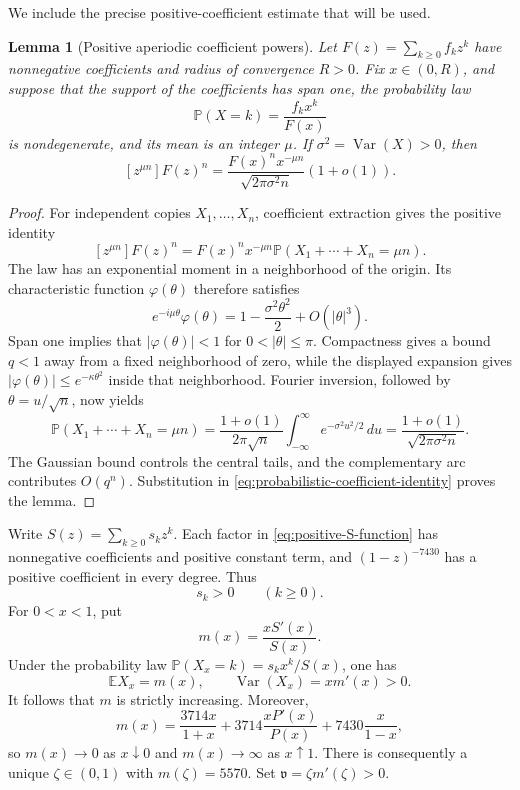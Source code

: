 \documentclass[11pt,reqno,letterpaper]{amsart}
\numberwithin{equation}{section}
\newtheorem{lemma}[theorem]{Lemma}
\theoremstyle{definition}
\theoremstyle{remark}
\begin{document}
We include the precise positive-coefficient estimate that will be used.

\begin{lemma}[Positive aperiodic coefficient powers]
\label{lem:positive-coefficient-powers}
Let \(F(z)=\sum_{k\geq0}f_kz^k\) have nonnegative coefficients and
radius of convergence \(R>0\).  Fix \(x\in(0,R)\), and suppose that the
support of the coefficients has span one, the probability law
\[
 \mathbb P(X=k)=\frac{f_kx^k}{F(x)}
\]
is nondegenerate, and its mean is an integer \(\mu\).  If
\(\sigma^2=\operatorname{Var}(X)>0\), then
\begin{equation}\label{eq:positive-power-asymptotic}
 [z^{\mu n}]F(z)^n
 =\frac{F(x)^nx^{-\mu n}}{\sqrt{2\pi\sigma^2n}}
  (1+o(1)).
\end{equation}
\end{lemma}

\begin{proof}
For independent copies \(X_1,\ldots,X_n\), coefficient extraction gives
the positive identity
\begin{equation}\label{eq:probabilistic-coefficient-identity}
 [z^{\mu n}]F(z)^n
 =F(x)^nx^{-\mu n}
  \mathbb P(X_1+\cdots+X_n=\mu n).
\end{equation}
The law has an exponential moment in a neighborhood of the origin.  Its
characteristic function \(\varphi(\theta)\) therefore satisfies
\[
 e^{-i\mu\theta}\varphi(\theta)
 =1-\frac{\sigma^2\theta^2}{2}+O(|\theta|^3).
\]
Span one implies that \(|\varphi(\theta)|<1\) for
\(0<|\theta|\leq\pi\).  Compactness gives a bound \(q<1\) away from a
fixed neighborhood of zero, while the displayed expansion gives
\(|\varphi(\theta)|\leq e^{-\kappa\theta^2}\) inside that neighborhood.
Fourier inversion, followed by \(\theta=u/\sqrt n\), now yields
\[
 \mathbb P(X_1+\cdots+X_n=\mu n)
 =\frac{1+o(1)}{2\pi\sqrt n}
   \int_{-\infty}^{\infty}e^{-\sigma^2u^2/2}\,du
 =\frac{1+o(1)}{\sqrt{2\pi\sigma^2n}}.
\]
The Gaussian bound controls the central tails, and the complementary
arc contributes \(O(q^n)\).  Substitution in
\eqref{eq:probabilistic-coefficient-identity} proves the lemma.
\end{proof}

Write \(S(z)=\sum_{k\geq0}s_kz^k\).  Each factor in
\eqref{eq:positive-S-function} has nonnegative coefficients and positive
constant term, and \((1-z)^{-7430}\) has a positive coefficient in every
degree.  Thus
\begin{equation}\label{eq:S-strict-positivity}
 s_k>0\qquad(k\geq0).
\end{equation}
For \(0<x<1\), put
\[
 m(x)=\frac{xS'(x)}{S(x)}.
\]
Under the probability law
\(\mathbb P(X_x=k)=s_kx^k/S(x)\), one has
\begin{equation}\label{eq:mean-variance-saddle}
 \mathbb E X_x=m(x),\qquad
 \operatorname{Var}(X_x)=x m'(x)>0.
\end{equation}
It follows that \(m\) is strictly increasing.  Moreover,
\[
 m(x)=\frac{3714x}{1+x}
      +3714\frac{xP'(x)}{P(x)}
      +7430\frac{x}{1-x},
\]
so \(m(x)\to0\) as \(x\downarrow0\) and \(m(x)\to\infty\) as
\(x\uparrow1\).  There is consequently a unique
\(\zeta\in(0,1)\) with \(m(\zeta)=5570\).  Set
\(\mathfrak v=\zeta m'(\zeta)>0\).
\end{document}
